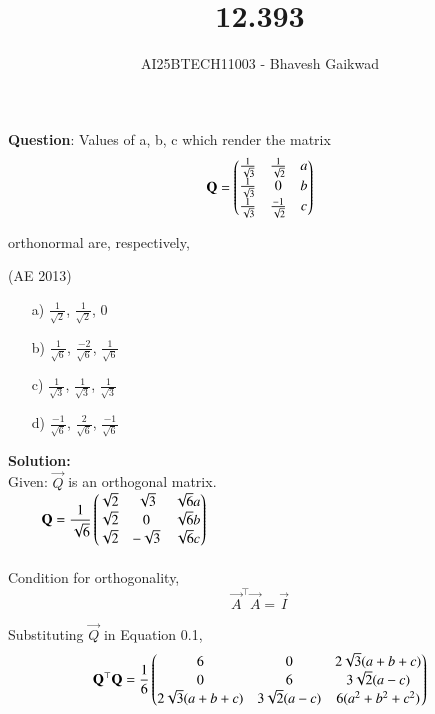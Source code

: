 \documentclass[journal]{IEEEtran}
\begin{document}

\vspace{3cm}

\title{12.393}
\author{AI25BTECH11003 - Bhavesh Gaikwad}
{\let\newpage\relax\maketitle}

\renewcommand{\thefigure}{\theenumi}
\renewcommand{\thetable}{\theenumi}
\setlength{\intextsep}{10pt} 

\renewcommand{\thetable}{\theenumi}


\textbf{Question}: 
Values of a, b, c which render the matrix $$\mathbf{Q} = \begin{pmatrix}\frac{1}{\sqrt{3}} & \frac{1}{\sqrt{2}} & a \\ 
\frac{1}{\sqrt{3}} & 0 & b \\
\frac{1}{\sqrt{3}} & \frac{-1}{\sqrt{2}} & c\end{pmatrix}$$

orthonormal are, respectively,

\hfill{(AE 2013)}
\begin{itemize}
    \item[a)]$\frac{1}{\sqrt{2}}$, $\frac{1}{\sqrt{2}}$, 0

    \item[b)]$\frac{1}{\sqrt{6}}$, $\frac{-2}{\sqrt{6}}$, $\frac{1}{\sqrt{6}}$

    \item[c)]$\frac{1}{\sqrt{3}}$, $\frac{1}{\sqrt{3}}$, $\frac{1}{\sqrt{3}}$

    \item[d)]$\frac{-1}{\sqrt{6}}$, $\frac{2}{\sqrt{6}}$, $\frac{-1}{\sqrt{6}}$
\end{itemize}
\bigskip
 
\textbf{Solution:}\\
Given: $\vec{Q}$ is an orthogonal matrix.\\
$\qquad$ $\mathbf{Q} = \dfrac{1}{\sqrt{6}}\begin{pmatrix}\sqrt{2} & \sqrt{3} & \sqrt{6}a \\ \sqrt{2} & 0 & \sqrt{6}b \\ \sqrt{2} & -\sqrt{3} & \sqrt{6}c\end{pmatrix}$\\\\

Condition for orthogonality,
\begin{equation}
    \vec{A}^\top\vec{A} = \vec{I}
\end{equation}

Substituting $\vec{Q}$ in Equation 0.1,
\begin{align}
\mathbf{Q}^\top\mathbf{Q} = \dfrac{1}{6} \begin{pmatrix}6 & 0 & 2\sqrt{3}(a+b+c) \\ 0 & 6 & 3\sqrt{2}(a-c) \\ 2\sqrt{3}(a+b+c) & 3\sqrt{2}(a-c) & 6(a^2 + b^2 + c^2)\end{pmatrix} 
\end{align}
\end{document}
